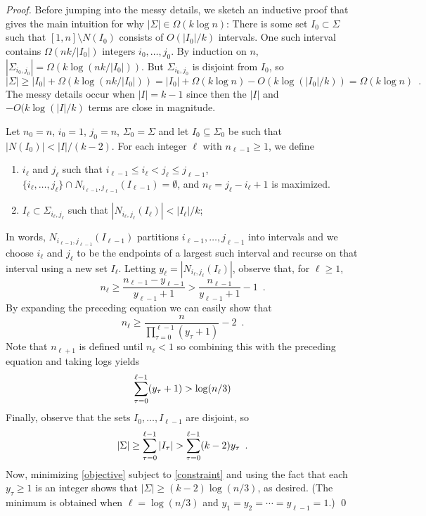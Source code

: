 \documentclass{llncs}
\begin{document}
\begin{proof}
   Before jumping into the messy details, we sketch an inductive proof
   that gives the main intuition for why $|\Sigma|\in \Omega(k\log n)$:
   There is some set $I_0\subset\Sigma$ such that $[1,n]\setminus N(I_0)$ consists of $O(|I_0|/k)$ intervals.  One such interval
   contains $\Omega(nk/|I_0|)$ integers $i_0,\ldots,j_0$.  By induction on $n$,
   $|\Sigma_{i_0,j_0}| = \Omega(k\log (nk/|I_0|))$.  But $\Sigma_{i_0,j_0}$
   is disjoint from $I_0$, so 
   \[  |\Sigma| \ge |I_0| + \Omega(k\log (nk/|I_0|))
        = |I_0| + \Omega(k\log n) - O(k\log(|I_0|/k))
        = \Omega(k\log n) \enspace .
   \]
   The messy details occur when $|I|=k-1$ since then the $|I|$ and
   $-O(k\log(|I|/k)$ terms are close in magnitude.

   Let $n_0=n$, $i_0=1$, $j_0=n$, $\Sigma_0=\Sigma$ and let
   $I_0\subseteq\Sigma_0$ be such that $|N(I_0)| < |I|/(k-2)$.
   For each integer $\ell$ with $n_{\ell-1}\ge 1$, we define 
   \begin{enumerate}
     \item $i_\ell$ and $j_\ell$ such that 
       $i_{\ell-1}\le i_\ell < j_\ell\le j_{\ell-1}$, 
       $\{i_\ell,\ldots,j_\ell\}\cap N_{i_{\ell-1},j_{\ell-1}}(I_{\ell-1})=\emptyset$, 
       and $n_\ell=j_\ell-i_\ell+1$ is maximized.
     \item $I_\ell\subset\Sigma_{i_\ell,j_\ell}$ such that
      $|N_{i_\ell,j_\ell}(I_\ell)| < |I_\ell|/k$;
   \end{enumerate}
   In words, $N_{i_{\ell-1},j_{\ell-1}}(I_{\ell-1})$ partitions $i_{\ell-1},\ldots,j_{\ell-1}$
   into intervals and we choose $i_\ell$ and $j_\ell$ to be the endpoints
   of a largest such interval and recurse on that interval using a new
   set $I_\ell$. Letting $y_\ell=|N_{i_\ell,j_\ell}(I_\ell)|$, observe that, for $\ell \ge 1$,
   \[
        n_\ell \ge \frac{n_{\ell-1}-y_{\ell-1}}{y_{\ell-1}+1}
               > \frac{n_{\ell-1}}{y_{\ell-1}+1} - 1 \enspace .
   \]
   By expanding the preceding equation we can easily show that
   \[
           n_{\ell} \ge \frac{n}{\prod_{\tau=0}^{\ell-1}(y_\tau+1)} - 2 \enspace .
   \]
   Note that $n_{\ell+1}$ is defined until $n_{\ell} < 1$ so combining this
   with the preceding equation and taking logs yields
   \begin{equation}
           \sum_{\tau=0}^{\ell-1}(y_\tau+1) > \log(n/3) \eqlabel{constraint}
   \end{equation}
   Finally, observe that the sets $I_0,\ldots,I_{\ell-1}$ are disjoint, so
   \begin{equation}
          |\Sigma| \ge \sum_{\tau=0}^{\ell-1} |I_\tau| >
             \sum_{\tau=0}^{\ell-1} (k-2)y_\tau \enspace . \eqlabel{objective}
   \end{equation}
   Now, minimizing \eqref{objective} subject to \eqref{constraint} and using
   the fact that each $y_\tau \ge 1$ is an integer shows that
   $|\Sigma|\ge (k-2)\log (n/3)$, as desired.  (The minimum is obtained when
   $\ell=\log(n/3)$ and $y_1=y_2=\cdots=y_{\ell-1}=1$.)
   \qed
\end{proof}
\end{document}
